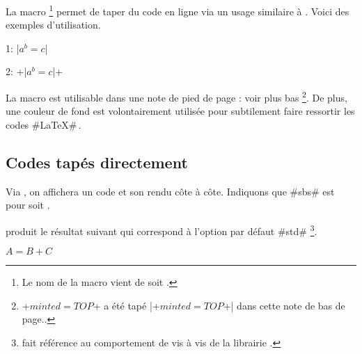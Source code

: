 La macro 
\footnote{
    Le nom de la macro  vient de  soit .
}
permet de taper du code en ligne via un usage similaire à .
Voici des exemples d'utilisation.


\begin{tdoclatex}[sbs]
    1: \tdocinlatex|$a^b = c$|

    2: \tdocinlatex+\tdocinlatex|$a^b = c$|+
\end{tdoclatex}


\begin{tdocnote}
    La macro  est utilisable dans une note de pied de page : voir plus bas
    \footnote{
        \tdocinlatex+$minted = TOP$+ a été tapé \tdocinlatex|\tdocinlatex+$minted = TOP$+| dans cette note de bas de page..
    }.
    De plus, une couleur de fond est volontairement utilisée pour subtilement faire ressortir les codes \tdocinlatex#\LaTeX#\,.
\end{tdocnote}




\subsection{Codes tapés directement}

\begin{tdocexa}
    Via , on affichera un code et son rendu côte à côte.
    Indiquons que \tdocinlatex#sbs# est pour  soit .
\end{tdocexa}




\begin{tdocexa}[À la suite]
     produit le résultat suivant qui correspond à l'option par défaut \tdocinlatex#std#
    \footnote{
         fait référence au comportement  de  vis à vis de la librairie .
    }.

    \begin{tdoclatex}
        $A = B + C$
    \end{tdoclatex}
\end{tdocexa}




